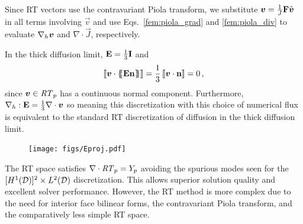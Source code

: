 \documentclass[../doc.tex]{subfiles}
\begin{document}
Since RT vectors use the contravariant Piola transform, we substitute $\boldsymbol{v} = \frac{1}{J}\boldsymbol{\mathrm{F}}\hat{\boldsymbol{v}}$ in all terms involving $\vec{v}$ and use Eqs.~\ref{fem:piola_grad} and \ref{fem:piola_div} to evaluate $\nabla_h\boldsymbol{v}$ and $\nabla\cdot\vec{J}$, respectively. 

In the thick diffusion limit, $\boldsymbol{\mathrm{E}} = \frac{1}{3}\boldsymbol{\mathrm{I}}$ and 
	\begin{equation}
		\left\llbracket\boldsymbol{v}\cdot\left\{\!\!\left\{\boldsymbol{\mathrm{E}}\boldsymbol{\mathrm{n}}\right\}\!\!\right\} \right\rrbracket = \frac{1}{3}\left\llbracket\boldsymbol{v}\cdot\boldsymbol{\mathrm{n}} \right\rrbracket = 0 \,, 
	\end{equation}
since $\boldsymbol{v} \in \mathit{RT}_p$ has a continuous normal component. Furthermore, $\nabla_h:\boldsymbol{\mathrm{E}} = \frac{1}{3}\nabla\cdot\boldsymbol{v}$ so meaning this discretization with this choice of numerical flux is equivalent to the standard RT discretization of diffusion in the thick diffusion limit. 
\begin{figure}
\centering
\texttt{[image: figs/Eproj.pdf]}
\caption{}
\label{rtvef:Eproj}
\end{figure}

The RT space satisfies $\nabla\cdot\mathit{RT}_p = Y_p$ avoiding the spurious modes seen for the $[H^1(\mathcal{D})]^2 \times L^2(\mathcal{D})$ discretization. This allows superior solution quality and excellent solver performance. However, the RT method is more complex due to the need for interior face bilinear forms, the contravariant Piola transform, and the comparatively less simple RT space. 

\section{}
\end{document}
